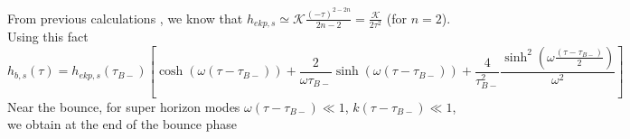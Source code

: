 \documentclass[12pt,a4paper]{article}
\numberwithin{equation}{section}
\numberwithin{equation}{section}
\begin{document}
From previous calculations \cite{Artymowski:2020pci}, we know that  $h_{ekp,s} \simeq \mathcal{K} \frac{(-\tau)^{2-2n}}{2n-2} = \frac{\mathcal{K}}{2 \tau^2}$ (for $n=2$).  Using this fact
\begin{equation}
h_{b,s} (\tau) = h_{ekp,s}(\tau_{B-}) \left[\cosh(\omega(\tau-\tau_{B-}))+ \frac{2}{\omega \tau_{B-}} \sinh(\omega(\tau-\tau_{B-})) 
+\frac{4}{\tau^2_{B-}} \frac{\sinh^2\left( \omega \frac{(\tau-\tau_{B-})}{2}\right)}{\omega^2}\right]
\label{eq:vir} 
\end{equation}
Near the bounce, for super horizon modes $\omega(\tau-\tau_{B-})\ll 1$, $k(\tau-\tau_{B-})\ll 1$, we obtain at the end of the bounce phase

    
            
\end{document}
